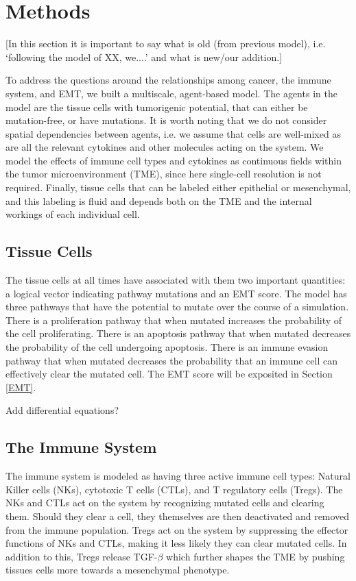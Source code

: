 \documentclass{article}
\begin{document}
\section{Methods}
[In this section it is important to say what is old (from previous model), i.e. `following the model of XX, we....' and what is new/our addition.]

To address the questions around the relationships among cancer, the immune system, and EMT, we built a multiscale, agent-based model.
The agents in the model are the tissue cells with tumorigenic potential, that can either be mutation-free, or have mutations.
It is worth noting that we do not consider spatial dependencies between agents, i.e. we assume that cells are well-mixed as are all the relevant cytokines and other molecules acting on the system.
We model the effects of immune cell types and cytokines as continuous fields within the tumor microenvironment (TME), since here single-cell resolution is not required. 
Finally, tissue cells that can be labeled either epithelial or mesenchymal, and this labeling is fluid and depends both on the TME and the internal workings of each individual cell.

\subsection{Tissue Cells}\label{TissueCells}
The tissue cells at all times have associated with them two important quantities: a logical vector indicating pathway mutations and an EMT score.
The model has three pathways that have the potential to mutate over the course of a simulation.
There is a proliferation pathway that when mutated increases the probability of the cell proliferating.
There is an apoptosis pathway that when mutated decreases the probability of the cell undergoing apoptosis.
There is an immune evasion pathway that when mutated decreases the probability that an immune cell can effectively clear the mutated cell.
The EMT score will be exposited in Section \ref{EMT}.


Add differential equations? %

\subsection{The Immune System}\label{ImmuneSystem}
The immune system is modeled as having three active immune cell types: Natural Killer cells (NKs), cytotoxic T cells (CTLs), and T regulatory cells (Tregs).
The NKs and CTLs act on the system by recognizing mutated cells and clearing them.
Should they clear a cell, they themselves are then deactivated and removed from the immune population.
Tregs act on the system by suppressing the effector functions of NKs and CTLs, making it less likely they can clear mutated cells.
In addition to this, Tregs release TGF-$\beta$ which further shapes the TME by pushing tissues cells more towards a mesenchymal phenotype.
\end{document}
